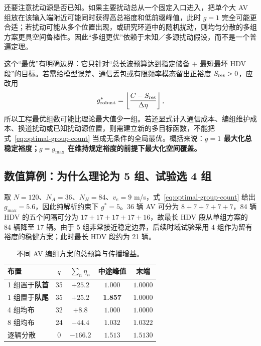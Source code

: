\documentclass[11pt,a4paper,openany]{book}
\numberwithin{equation}{chapter}
\numberwithin{figure}{chapter}
\numberwithin{table}{chapter}
\begin{document}
还要注意扰动源是否已知。如果主要扰动总从一个固定入口进入，把单个大 AV 组放在该输入端附近可能同时获得高总裕度和低前缀峰值，此时 $g=1$ 完全可能更合适；若扰动可能从多个位置出现，或研究环道中的随机扰动，则均匀分散的多组方案更具空间鲁棒性。因此“多组更优”依赖于未知／多源扰动假设，而不是一个普遍定理。

这个“最优”有明确边界：它只针对“总长波预算达到指定储备 $+$ 最短最坏 HDV 段”的目标。若需给模型误差、通信丢包或有限频率模态留出正裕度 $S_{\rm res}>0$，应改用
\begin{equation}
g_{\rm robust}^*
=\left\lfloor\frac{C-S_{\rm res}}{\Delta\eta}\right\rfloor,
\label{eq:robust-group-count}
\end{equation}
所以工程最优组数可能比理论最大值少一组。若还显式计入通信成本、编组维护成本、换道扰动或已知扰动源位置，则需建立新的多目标函数，不能把式~\eqref{eq:optimal-group-count} 当成无条件的全局最优。概括来说：\textbf{$g=1$ 最大化总稳定裕度；$g=g_{\max}$ 在维持规定裕度的前提下最大化空间覆盖。}

\subsection{数值算例：为什么理论为 5 组、试验选 4 组}

取 $N=120$、$N_A=36$、$N_H=84$、$v_e=9$ m/s，式~\eqref{eq:optimal-group-count} 给出 $g_{\max}=5.6$，因此纯解析约束下 $g^*=5$。36 辆 AV 可分为 $8+7+7+7+7$，84 辆 HDV 的五个间隔可分为 $17+17+17+17+16$，故最长 HDV 段从单组方案的 84 辆降至 17 辆。由于 5 组非常接近稳定边界，后续时域试验采用 4 组作为留有裕度的稳健方案；此时最长 HDV 段约为 21 辆。

\begin{table}[htbp]
\centering
\caption{不同 AV 编组方案的总预算与传播增益。}
\label{tab:grouping-alternatives}
\begin{tabular}{lcccc}
\toprule
布置 & $q$ & $\sum_n\eta_n$ & 中途峰值 & 末端 \\
\midrule
1 组置于\textbf{队首} & 35 & $+25.2$ & $1.000$ & $1.0000$ \\
1 组置于\textbf{队尾} & 35 & $+25.2$ & \textbf{1.857} & $1.0000$ \\
4 组均布 & 32 & $+8.8$ & $1.000$ & $1.0000$ \\
8 组均布 & 24 & $-44.4$ & $1.032$ & $1.0322$ \\
逐辆分散 & 0 & $-166.2$ & $1.513$ & $1.5130$ \\
\bottomrule
\end{tabular}
\end{table}
\end{document}
